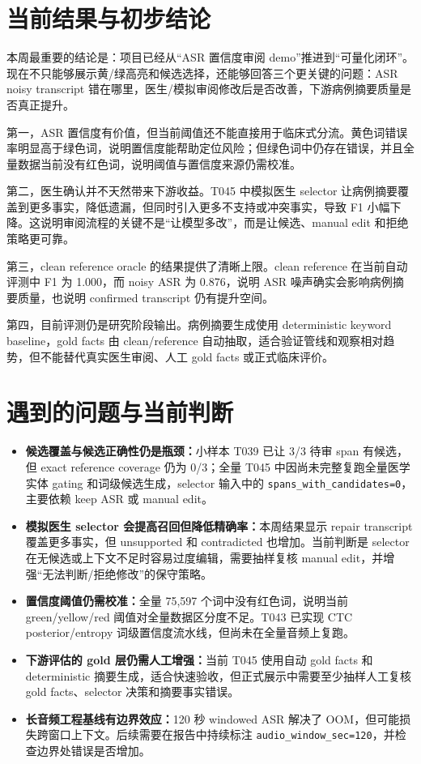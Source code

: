 \documentclass[UTF8,a4paper,12pt]{ctexart}
\newcommand{\code}[1]{\texttt{#1}}
\begin{document}
\section{当前结果与初步结论}

本周最重要的结论是：项目已经从“ASR 置信度审阅 demo”推进到“可量化闭环”。现在不只能够展示黄/绿高亮和候选选择，还能够回答三个更关键的问题：ASR noisy transcript 错在哪里，医生/模拟审阅修改后是否改善，下游病例摘要质量是否真正提升。

第一，ASR 置信度有价值，但当前阈值还不能直接用于临床式分流。黄色词错误率明显高于绿色词，说明置信度能帮助定位风险；但绿色词中仍存在错误，并且全量数据当前没有红色词，说明阈值与置信度来源仍需校准。

第二，医生确认并不天然带来下游收益。T045 中模拟医生 selector 让病例摘要覆盖到更多事实，降低遗漏，但同时引入更多不支持或冲突事实，导致 F1 小幅下降。这说明审阅流程的关键不是“让模型多改”，而是让候选、manual edit 和拒绝策略更可靠。

第三，clean reference oracle 的结果提供了清晰上限。clean reference 在当前自动评测中 F1 为 1.000，而 noisy ASR 为 0.876，说明 ASR 噪声确实会影响病例摘要质量，也说明 confirmed transcript 仍有提升空间。

第四，目前评测仍是研究阶段输出。病例摘要生成使用 deterministic keyword baseline，gold facts 由 clean/reference 自动抽取，适合验证管线和观察相对趋势，但不能替代真实医生审阅、人工 gold facts 或正式临床评价。

\section{遇到的问题与当前判断}

\begin{itemize}
  \item \textbf{候选覆盖与候选正确性仍是瓶颈：}小样本 T039 已让 3/3 待审 span 有候选，但 exact reference coverage 仍为 0/3；全量 T045 中因尚未完整复跑全量医学实体 gating 和词级候选生成，selector 输入中的 \code{spans\_with\_candidates=0}，主要依赖 keep ASR 或 manual edit。
  \item \textbf{模拟医生 selector 会提高召回但降低精确率：}本周结果显示 repair transcript 覆盖更多事实，但 unsupported 和 contradicted 也增加。当前判断是 selector 在无候选或上下文不足时容易过度编辑，需要抽样复核 manual edit，并增强“无法判断/拒绝修改”的保守策略。
  \item \textbf{置信度阈值仍需校准：}全量 75,597 个词中没有红色词，说明当前 green/yellow/red 阈值对全量数据区分度不足。T043 已实现 CTC posterior/entropy 词级置信度流水线，但尚未在全量音频上复跑。
  \item \textbf{下游评估的 gold 层仍需人工增强：}当前 T045 使用自动 gold facts 和 deterministic 摘要生成，适合快速验收，但正式展示中需要至少抽样人工复核 gold facts、selector 决策和摘要事实错误。
  \item \textbf{长音频工程基线有边界效应：}120 秒 windowed ASR 解决了 OOM，但可能损失跨窗口上下文。后续需要在报告中持续标注 \code{audio\_window\_sec=120}，并检查边界处错误是否增加。
\end{itemize}
\end{document}
